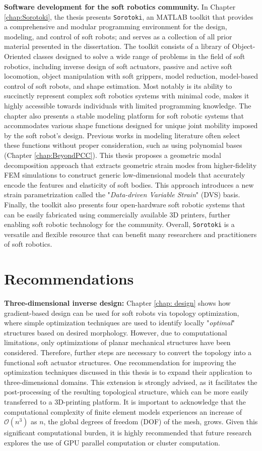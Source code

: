 \textbf{Software development for the soft robotics community.} In Chapter \ref{chap:Sorotoki}, the thesis presents \texttt{Sorotoki}, an MATLAB toolkit that provides a comprehensive and modular programming environment for the design, modeling, and control of soft robots; and  serves as a collection of all prior material presented in the dissertation. The toolkit consists of a library of Object-Oriented classes designed to solve a wide range of problems in the field of soft robotics, including inverse design of soft actuators, passive and active soft locomotion, object manipulation with soft grippers, model reduction, model-based control of soft robots, and shape estimation. Most notably is its ability to succinctly represent complex soft robotics systems with minimal code, makes it highly accessible towards individuals with limited programming knowledge. The chapter also presents a stable modeling platform for soft robotic systems that accommodates various shape functions designed for unique joint mobility imposed by the soft robot's design. Previous works in modeling literature often select these functions without proper consideration, such as using polynomial bases (Chapter \ref{chap:BeyondPCC}). This thesis proposes a geometric modal decomposition approach that extracts geometric strain modes from higher-fidelity FEM simulations to construct generic low-dimensional models that accurately encode the features and elasticity of soft bodies. This approach introduces a new strain parametrization called the "\textit{Data-driven Variable Strain}" (DVS) basis. Finally, the toolkit also presents four open-hardware soft robotic systems that can be easily fabricated using commercially available 3D printers, further enabling soft robotic technology for the community. Overall, \texttt{Sorotoki} is a versatile and flexible resource that can benefit many researchers and practitioners of soft robotics.

\section[Recommendations]{Recommendations}
\textbf{Three-dimensional inverse design:}  Chapter \ref{chap: design} shows how gradient-based design can be used for soft robots via topology optimization, where simple optimization techniques are used to identify locally "\textit{optimal}" structures based on desired morphology. However, due to computational limitations, only optimizations of planar mechanical structures have been considered. Therefore, further steps are necessary to convert the topology into a functional soft actuator structures. One recommendation for improving the optimization techniques discussed in this thesis is to expand their application to three-dimensional domains. This extension is strongly advised, as it facilitates the post-processing of the resulting topological structure, which can be more easily transferred to a 3D-printing platform. It is important to acknowledge that the computational complexity of finite element models experiences an increase of $\mathcal{O}(n^3)$ as $n$, the global degrees of freedom (DOF) of the mesh, grows. Given this significant computational burden, it is highly recommended that future research explores the use of GPU parallel computation or cluster computation. 

